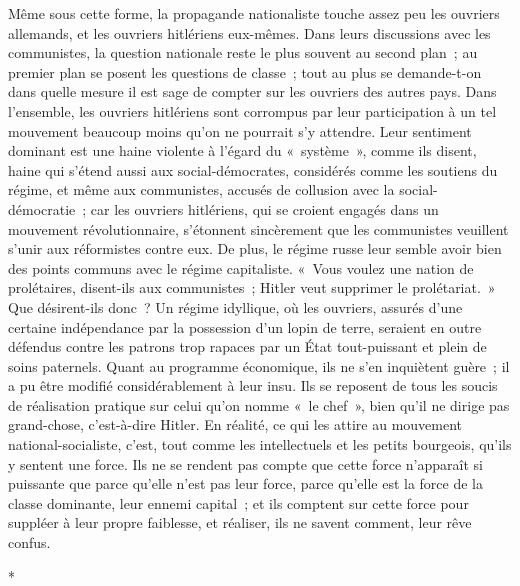\documentclass[french,twoside]{book} %
\begin{document}
Même sous cette forme, la propagande nationaliste touche assez peu les ouvriers allemands, et les ouvriers hitlériens eux-mêmes. Dans leurs discus­sions avec les communistes, la question nationale reste le plus souvent au second plan ; au premier plan se posent les questions de classe ; tout au plus se demande-t-on dans quelle mesure il est sage de compter sur les ouvriers des autres pays. Dans l'ensemble, les ouvriers hitlériens sont corrompus par leur participation à un tel mouvement beaucoup moins qu'on ne pourrait s'y attendre. Leur sentiment dominant est une haine violente à l'égard du « systè­me », comme ils disent, haine qui s'étend aussi aux social-démocrates, consi­dérés comme les soutiens du régime, et même aux communistes, accusés de collusion avec la social-démocratie ; car les ouvriers hitlériens, qui se croient engagés dans un mouvement révolutionnaire, s'étonnent sincèrement que les communistes veuillent s'unir aux réformistes contre eux. De plus, le régime russe leur semble avoir bien des points communs avec le régime capitaliste. « Vous voulez une nation de prolétaires, disent-ils aux communistes ; Hitler veut supprimer le prolétariat. » Que désirent-ils donc ? Un régime idyllique, où les ouvriers, assurés d'une certaine indépendance par la possession d'un lopin de terre, seraient en outre défendus contre les patrons trop rapaces par un État tout-puissant et plein de soins paternels. Quant au programme économi­que, ils ne s'en inquiètent guère ; il a pu être modifié considérablement à leur insu. Ils se reposent de tous les soucis de réalisation pratique sur celui qu'on nomme « le chef », bien qu'il ne dirige pas grand-chose, c'est-à-dire Hitler. En réalité, ce qui les attire au mouvement national-socialiste, c'est, tout comme les intellectuels et les petits bourgeois, qu'ils y sentent une force. Ils ne se rendent pas compte que cette force n'apparaît si puissante que parce qu'elle n'est pas leur force, parce qu'elle est la force de la classe dominante, leur ennemi capital ; et ils comptent sur cette force pour suppléer à leur propre faiblesse, et réaliser, ils ne savent comment, leur rêve confus.\par

\begin{center}
\noindent \centerline{*}\par
\end{center}
\end{document}
